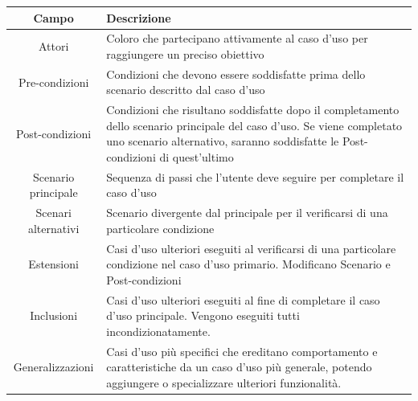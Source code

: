 \documentclass[10pt, letterpaper]{article}
\begin{document}
\begin{center}
    \begin{tabularx}{\textwidth}{|c| >{\centering\arraybackslash}X|}
        \hline
        \rowcolor{lightgray} \textbf{Campo} & \textbf{Descrizione}                                                                                                                                                                                      \\
        \hline
        Attori                              & Coloro che partecipano attivamente al caso d'uso per raggiungere un preciso obiettivo                                                                                                                     \\
        \hline
        Pre-condizioni                      & Condizioni che devono essere soddisfatte prima dello scenario descritto dal caso d'uso                                                                                                                    \\
        \hline
        Post-condizioni                     & Condizioni che risultano soddisfatte dopo il completamento dello scenario principale del caso d'uso. Se viene completato uno scenario alternativo, saranno soddisfatte le Post-condizioni di quest'ultimo \\
        \hline
        Scenario principale                 & Sequenza di passi che l'utente deve seguire per completare il caso d'uso                                                                                                                                  \\
        \hline
        Scenari alternativi                 & Scenario divergente dal principale per il verificarsi di una particolare condizione                                                                                                                       \\
        \hline
        Estensioni                          & Casi d'uso ulteriori eseguiti al verificarsi di una particolare condizione nel caso d'uso primario. Modificano Scenario e Post-condizioni                                                                 \\
        \hline
        Inclusioni                          & Casi d'uso ulteriori eseguiti al fine di completare il caso d'uso principale. Vengono eseguiti tutti incondizionatamente.                                                                                 \\
        \hline
        Generalizzazioni                    & Casi d'uso più specifici che ereditano comportamento e caratteristiche da un caso d'uso più generale, potendo aggiungere o specializzare ulteriori funzionalità.                                          \\
        \hline
    \end{tabularx}
\end{center}
\end{document}

